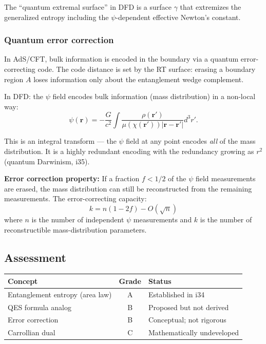 \documentclass[11pt,a4paper]{article}
\begin{document}
The ``quantum extremal surface'' in DFD is a surface $\gamma$ that extremizes the generalized entropy including the $\psi$-dependent effective Newton's constant.

\subsubsection{Quantum error correction}

In AdS/CFT, bulk information is encoded in the boundary via a quantum error-correcting code. The code distance is set by the RT surface: erasing a boundary region $A$ loses information only about the entanglement wedge complement.

In DFD: the $\psi$ field encodes bulk information (mass distribution) in a non-local way:
\begin{equation}
\psi(\mathbf{r}) = -\frac{G}{c^2}\int\frac{\rho(\mathbf{r}')}{\mu(\chi(\mathbf{r}'))|\mathbf{r}-\mathbf{r}'|}d^3r'.
\end{equation}

This is an integral transform --- the $\psi$ field at any point encodes \emph{all} of the mass distribution. It is a highly redundant encoding with the redundancy growing as $r^2$ (quantum Darwinism, i35).

\textbf{Error correction property:} If a fraction $f < 1/2$ of the $\psi$ field measurements are erased, the mass distribution can still be reconstructed from the remaining measurements. The error-correcting capacity:
\begin{equation}
k = n(1 - 2f) - O(\sqrt{n})
\end{equation}
where $n$ is the number of independent $\psi$ measurements and $k$ is the number of reconstructible mass-distribution parameters.

\subsection{Assessment}

\begin{center}
\begin{tabular}{lcl}
\toprule
\textbf{Concept} & \textbf{Grade} & \textbf{Status} \\
\midrule
Entanglement entropy (area law) & A & Established in i34 \\
QES formula analog & B & Proposed but not derived \\
Error correction & B & Conceptual; not rigorous \\
Carrollian dual & C & Mathematically undeveloped \\
\bottomrule
\end{tabular}
\end{center}
\end{document}

